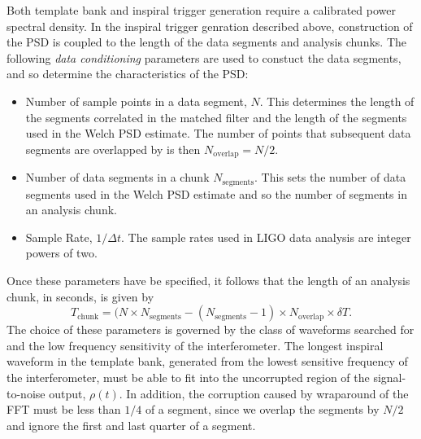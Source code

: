 Both template bank and inspiral trigger generation require a calibrated power
spectral density. In the inspiral trigger genration described above,
construction of the PSD is coupled to the length of the data segments and
analysis chunks. The following \emph{data conditioning} parameters are used to
constuct the data segments, and so determine the characteristics of the PSD:
\begin{itemize}
\item Number of sample points in a data segment, $N$. This
determines the length of the segments correlated in the matched filter and the
length of the segments used in the Welch PSD estimate. The number of points
that subsequent data segments are overlapped by is then $N_\mathrm{overlap} =
N/2$.

\item Number of data segments in a chunk $N_\mathrm{segments}$. This sets the
number of data segments used in the Welch PSD estimate and so the number of
segments in an analysis chunk.

\item Sample Rate, $1/\Delta t$. The sample rates used in LIGO data analysis
are integer powers of two.
\end{itemize}
Once these parameters have be specified, it follows that the length of an
analysis chunk, in seconds, is given by
\begin{equation}
T_\mathrm{chunk} = (N \times N_\mathrm{segments} - ( N_\mathrm{segments} - 1 )
\times N_\mathrm{overlap} \times \delta T.
\end{equation}
The choice of these parameters is governed by the class of waveforms searched
for and the low frequency sensitivity of the interferometer. The longest
inspiral waveform in the template bank, generated from the lowest sensitive
frequency of the interferometer, must be able to fit into the uncorrupted
region of the signal-to-noise output, $\rho(t)$. In addition, the corruption
caused by wraparound of the FFT must be less than $1/4$ of a segment, since we
overlap the segments by $N/2$ and ignore the first and last quarter of a
segment.

